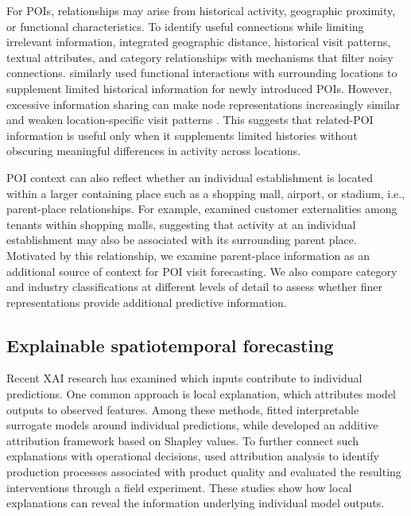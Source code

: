\documentclass[preprint,authoryear,11pt]{elsarticle}
\def\citep#1{}%
\theoremstyle{definition}
\begin{document}
For POIs, relationships may arise from historical activity, geographic proximity, or functional characteristics. 
To identify useful connections while limiting irrelevant information, \citet{hajisafi2023learning} integrated geographic distance, historical visit patterns, textual attributes, and category relationships with mechanisms that filter noisy connections. 
\citet{zhang2026causalpoi} similarly used functional interactions with surrounding locations to supplement limited historical information for newly introduced POIs. 
However, excessive information sharing can make node representations increasingly similar and weaken location-specific visit patterns \citep{li2018deeper,oono2020graph}. 
This suggests that related-POI information is useful only when it supplements limited histories without obscuring meaningful differences in activity across locations.

POI context can also reflect whether an individual establishment is located within a larger containing place such as a shopping mall, airport, or stadium, i.e., parent-place relationships.
For example, \citet{gould2005contracts} examined customer externalities among tenants within shopping malls, suggesting that activity at an individual establishment may also be associated with its surrounding parent place.
Motivated by this relationship, we examine parent-place information as an additional source of context for POI visit forecasting.
We also compare category and industry classifications at different levels of detail to assess whether finer representations provide additional predictive information.


\subsection{Explainable spatiotemporal forecasting}
\label{lit_exp}

Recent XAI research has examined which inputs contribute to individual predictions.
One common approach is local explanation, which attributes model outputs to observed features.
Among these methods, \citet{ribeiro2016should} fitted interpretable surrogate models around individual predictions, while \citet{lundberg2017unified} developed an additive attribution framework based on Shapley values.
To further connect such explanations with operational decisions, \citet{senoner2022using} used attribution analysis to identify production processes associated with product quality and evaluated the resulting interventions through a field experiment.
These studies show how local explanations can reveal the information underlying individual model outputs.
\end{document}

